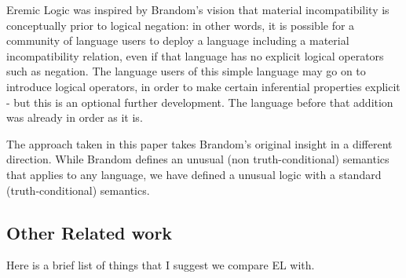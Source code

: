 Eremic Logic was inspired by Brandom's vision that material incompatibility is conceptually prior to logical negation:
in other words, it is possible for a community of language users to deploy a language including a material incompatibility relation, even if that language has no explicit logical operators such as negation.
The language users of this simple language may go on to introduce logical operators, in order to make certain inferential properties explicit - but this is an optional further development. 
The language before that addition was already in order as it is.

The approach taken in this paper takes Brandom's original insight in a different direction.
While Brandom defines an unusual (non truth-conditional) semantics that applies to any language, we have defined a unusual logic with a standard (truth-conditional) semantics.






\subsection{Other Related work}

Here is a brief list of things that I suggest we compare EL with.

